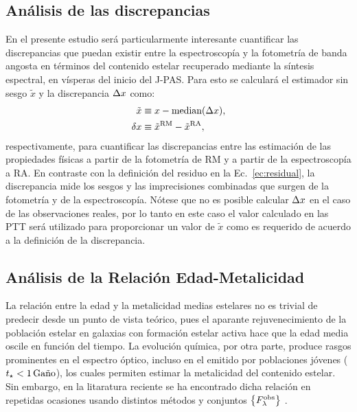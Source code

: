 \subsection{Análisis de las discrepancias}

En el presente estudio será particularmente interesante cuantificar las discrepancias que puedan
existir entre la espectroscopía y la fotometría de banda angosta en términos del contenido estelar
recuperado mediante la síntesis espectral, en vísperas del inicio del J-PAS. Para esto se calculará
el estimador sin sesgo $\tilde{x}$ y la discrepancia $\res{x}$ como:
%
\begin{subequations}\label{ec:discrepancy}
\begin{align}
\tilde{x} &\equiv x - \text{median}(\res{x}), \\
\dis{x}   &\equiv \tilde{x}^\text{RM}-\tilde{x}^\text{RA},
\end{align}
\end{subequations}
%
respectivamente, para cuantificar las discrepancias entre las estimación de las propiedades físicas
a partir de la fotometría de RM y a partir de la espectroscopía a RA. En contraste con la definición
del residuo en la Ec.~\eqref{ec:residual}, la discrepancia mide los sesgos y las imprecisiones
combinadas que surgen de la fotometría y de la espectroscopía. Nótese que no es posible calcular
$\res{x}$ en el caso de las observaciones reales, por lo tanto en este caso el valor calculado en
las PTT será utilizado para proporcionar un valor de $\tilde{x}$ como es requerido de acuerdo a la
definición de la discrepancia.

\subsection{Análisis de la Relación Edad-Metalicidad}

La relación entre la edad y la metalicidad medias estelares no es trivial de predecir desde un punto
de vista teórico, pues el aparante rejuvenecimiento de la población estelar en galaxias con
formación estelar activa hace que la edad media oscile en función del tiempo. La evolución química,
por otra parte, produce rasgos prominentes en el espectro óptico, incluso en el emitido por
poblaciones jóvenes ($t_\star<\unit[1]{Gaño}$), los cuales permiten estimar la metalicidad del
contenido estelar. Sin embargo, en la litaratura reciente se ha encontrado dicha relación en
repetidas ocasiones usando distintos métodos y conjuntos $\set{\sedt[F]{obs}}$
\citep[\eg,][]{Worthey1994, Gallazzi2005, Panter2008}.

